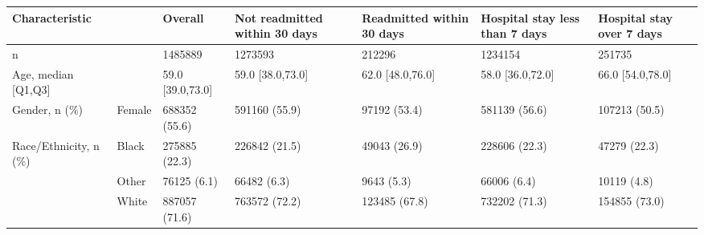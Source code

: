 \begin{tabular}{L{20em}C{10em}C{10em}C{10em}C{10em}C{10em}}
\toprule
                          \textbf{Characteristic}  &                                       \textbf{}  &  \textbf{Overall}  & \textbf{Not readmitted within 30 days}  & \textbf{Readmitted within 30 days}  & \textbf{Hospital stay less than 7 days}  & \textbf{Hospital stay over 7 days}  \\
\midrule
                                                 n &                                    \hspace{3mm}  &            1485889 &                                 1273593 &                              212296 &                                  1234154 &                              251735 \\
                               Age, median [Q1,Q3] &                                    \hspace{3mm}  &   59.0 [39.0,73.0] &                        59.0 [38.0,73.0] &                    62.0 [48.0,76.0] &                         58.0 [36.0,72.0] &                    66.0 [54.0,78.0] \\
                                     Gender, n (\%) &                              \hspace{3mm} Female &      688352 (55.6) &                           591160 (55.9) &                        97192 (53.4) &                            581139 (56.6) &                       107213 (50.5) \\
                             Race/Ethnicity, n (\%) &                               \hspace{3mm} Black &      275885 (22.3) &                           226842 (21.5) &                        49043 (26.9) &                            228606 (22.3) &                        47279 (22.3) \\
                                                   &                               \hspace{3mm} Other &        76125 (6.1) &                             66482 (6.3) &                          9643 (5.3) &                              66006 (6.4) &                         10119 (4.8) \\
                                                   &                               \hspace{3mm} White &      887057 (71.6) &                           763572 (72.2) &                       123485 (67.8) &                            732202 (71.3) &                       154855 (73.0) \\

\end{tabular}
